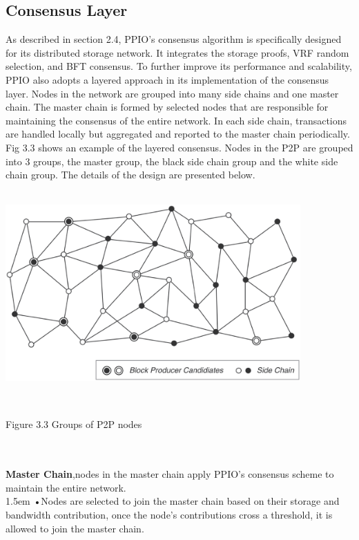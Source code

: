 \documentclass[10pt,a4paper]{article}
\begin{document}
        \subsection{Consensus Layer}  %
As described in section 2.4, PPIO’s consensus algorithm is specifically designed for its distributed storage network. It integrates the storage proofs, VRF random selection, and BFT consensus. To further improve its performance and scalability, PPIO also adopts a layered approach in its implementation of the consensus layer. Nodes in the network are grouped into many side chains and one master chain. The master chain is formed by selected nodes that are responsible for maintaining the consensus of the entire network. In each side chain, transactions are handled locally but aggregated and reported to the master chain periodically. Fig 3.3 shows an example of the layered consensus. Nodes in the P2P are grouped into 3 groups, the master group, the black side chain group and the white side chain group. The details of the design are presented below.
\vspace{-0.6em}
\\ \\
\centerline{\includegraphics[width=320pt]{fig13}}
\vspace{-0.8em}
\\ \centerline{{Figure 3.3 Groups of P2P nodes}}
\vspace{-1.5em}
\\\\
\noindent   
{\bf Master Chain},nodes in the master chain apply PPIO’s consensus scheme to maintain the entire network.
\vspace{-0.8em}
\\

\hangindent 1.5em
\noindent   
•\quad Nodes are selected to join the master chain based on their storage and bandwidth contribution, once the node's contributions cross a threshold, it is allowed to join the master chain.
\vspace{-0.8em}
\\
\end{document}
